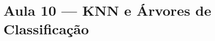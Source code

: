 \documentclass[11pt,a4paper]{article}
\begin{document}
\begin{exercicio}
\label{ex:09-suporte}

\end{exercicio}

\begin{exercicio}
\label{ex:09-radial}

\end{exercicio}

\section*{Aula 10 --- KNN e Árvores de Classificação}

\begin{exercicio}
\label{ex:10-voto}

\end{exercicio}

\begin{exercicio}
\label{ex:10-poda}

\end{exercicio}

\begin{exercicio}
\label{ex:10-impureza}

\end{exercicio}
\end{document}
